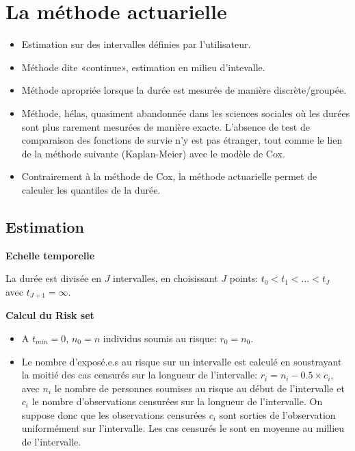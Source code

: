 \documentclass[
  12pt,
  letterpaper,
  DIV=11,
  numbers=noendperiod,
  onepage,
  openany]{scrreprt}
\providecommand{\tightlist}{%
  \setlength{\itemsep}{0pt}\setlength{\parskip}{0pt}}\usepackage{longtable,booktabs,array}
\begin{document}
\hypertarget{la-muxe9thode-actuarielle}{%
\section{\texorpdfstring{\textbf{La méthode
actuarielle}}{La méthode actuarielle}}\label{la-muxe9thode-actuarielle}}

\begin{itemize}
\tightlist
\item
  Estimation sur des intervalles définies par l'utilisateur.
\item
  Méthode dite «continue», estimation en milieu d'intevalle.
\item
  Méthode apropriée lorsque la durée est mesurée de manière
  discrète/groupée.
\item
  Méthode, hélas, quasiment abandonnée dans les sciences sociales où les
  durées sont plus rarement mesurées de manière exacte. L'absence de
  test de comparaison des fonctions de survie n'y est pas étranger, tout
  comme le lien de la méthode suivante (Kaplan-Meier) avec le modèle de
  Cox.
\item
  Contrairement à la méthode de Cox, la méthode actuarielle permet de
  calculer les quantiles de la durée.
\end{itemize}

\hypertarget{estimation}{%
\subsection{Estimation}\label{estimation}}

\textbf{Echelle temporelle}

La durée est divisée en \(J\) intervalles, en choisissant \(J\) points:
\(t_0<t_1<...<t_J\) avec \(t_{J+1}=\infty\).

\textbf{Calcul du Risk set}

\begin{itemize}
\tightlist
\item
  A \(t_{min}=0\), \(n_0=n\) individus soumis au risque: \(r_0=n_0\).
\item
  Le nombre d'exposé.e.s au risque sur un intervalle est calculé en
  soustrayant la moitié des cas censurés sur la longueur de
  l'intervalle: \(r_i=n_i- 0.5\times{c_i}\), avec \(n_i\) le nombre de
  personnes soumises au risque au début de l'intervalle et \(c_i\) le
  nombre d'observations censurées sur la longueur de l'intervalle. On
  suppose donc que les observations censurées \(c_i\) sont sorties de
  l'observation uniformément sur l'intervalle. Les cas censurés le sont
  en moyenne au millieu de l'intervalle.
\end{itemize}
\end{document}
